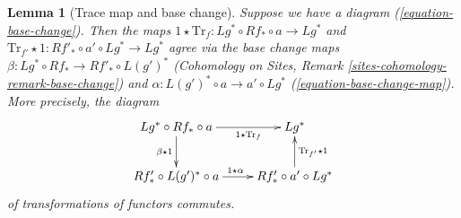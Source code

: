 \documentclass{stacks-project}
\theoremstyle{plain}
\newtheorem{lemma}[subsection]{Lemma}
\theoremstyle{definition}
\theoremstyle{remark}
\numberwithin{equation}{subsection}
\begin{document}
\begin{lemma}[Trace map and base change]
\label{lemma-trace-map-and-base-change}
Suppose we have a diagram (\ref{equation-base-change}).
Then the maps
$1 \star \text{Tr}_f : Lg^* \circ Rf_* \circ a \to Lg^*$ and
$\text{Tr}_{f'} \star 1 : Rf'_* \circ a' \circ Lg^* \to Lg^*$
agree via the base change maps
$\beta : Lg^* \circ Rf_* \to Rf'_* \circ L(g')^*$
(Cohomology on Sites, Remark \ref{sites-cohomology-remark-base-change})
and $\alpha : L(g')^* \circ a \to a' \circ Lg^*$
(\ref{equation-base-change-map}).
More precisely, the diagram
$$
\xymatrix{
Lg^* \circ Rf_* \circ a
\ar[d]_{\beta \star 1} \ar[r]_-{1 \star \text{Tr}_f} &
Lg^* \\
Rf'_* \circ L(g')^* \circ a \ar[r]^{1 \star \alpha} &
Rf'_* \circ a' \circ Lg^* \ar[u]_{\text{Tr}_{f'} \star 1}
}
$$
of transformations of functors commutes.
\end{lemma}
\end{document}
